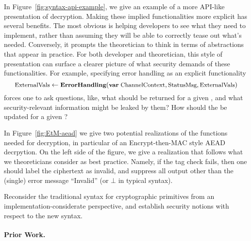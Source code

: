 In Figure~\ref{fig:syntax-api-example}, we give an example of a more
API-like presentation of decryption.
%
Making these implied functionalities more explicit has several benefits.  The
most obvious is helping developers to see what they need to implement, rather
than assuming they will be able to correctly tease out what's needed.
Conversely, it prompts the theoretician to think in terms of abstractions that
appear in practice.
%
For both developer and theoretician, this style of presentation can surface a
clearer picture of what security demands of these functionalities. For example,
specifying error handling as an explicit functionality
\[
\textrm{\small ExternalVals} \gets
                                  \textrm{\small\bf ErrorHandling}(\textrm{\small\bf var}\;
                                  \textrm{\small ChannelContext},
                                  \textrm{\small StatusMsg}, \textrm{\small ExternalVals})
\]
forces one to ask questions, like, what  should
be returned for a given , and what
security-relevant information might be leaked by them?  How should the
 be updated for a given ?

In Figure~\ref{fig:EtM-aead} we give two potential realizations of the
functions needed for decryption, in particular of an Encrypt-then-MAC
style AEAD decrpytion.  On the left side of the figure, we
give a realization that follows what we theoreticians consider as best
practice.  Namely, if the tag check fails, then one should label the
ciphertext as invalid, and suppress all output other than the (single)
error message ``Invalid'' (or $\bot$ in typical syntax).





\begin{task}
{Reconsider the traditional syntax for cryptographic primitives from an implementation-considerate perspective, and establish security notions with respect to the new syntax. }
\end{task}

\paragraph{Prior Work. }
%
